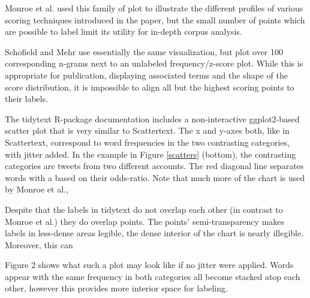 \documentclass[11pt]{article}
\begin{document}
Monroe et al.  used this family of plot to illustrate the different profiles of various scoring techniques introduced in the paper, but the small number of points which are possible to label limit its utility for in-depth corpus analysis.  

Schofield and Mehr  use essentially the same visualization, but plot over 100 corresponding n-grams next to an unlabeled frequency/z-score plot.  While this is appropriate for publication, displaying associated terms and the shape of the score distribution, it is impossible to align all but the highest scoring points to their labels. 

The tidytext R-package \cite{tidytext} documentation includes a non-interactive ggplot2-based \cite{ggplot2} scatter plot that is very similar to Scattertext.   The x and y-axes both, like in Scattertext, correspond to word frequencies in the two contrasting categories, with jitter added.   In the example in Figure \ref{scatters} (bottom), the contrasting categories are tweets from two different accounts.  The red diagonal line separates words with a based on their odds-ratio.  Note that much more of the chart is used by Monroe et al., 

Despite that the labels in tidytext do not overlap each other (in contrast to Monroe et al.) they do overlap points.  The points' semi-transparency makes labels in less-dense areas legible, the dense interior of the chart is nearly illegible.  Moreover, this can 

Figure 2 shows what such a plot may look like if no jitter were applied.  Words appear with the same frequency in both categories all become stacked atop each other, however this provides more interior space for labeling. 
\end{document}
